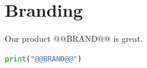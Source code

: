 \section{Branding}

Our product @@BRAND@@ is great.

\begin{lstlisting}[language=Python, caption={Example}, label=lst:brand]
print("@@BRAND@@")
\end{lstlisting}
